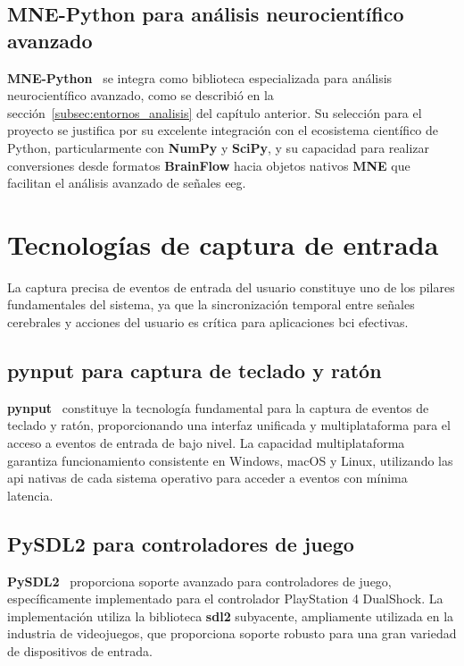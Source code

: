 \subsection{\textbf{MNE-Python} para análisis neurocientífico avanzado}
\label{subsec:mne_python}

\textbf{MNE-Python}~\cite{gramfort2013meg} se integra como biblioteca especializada para análisis neurocientífico avanzado, como se describió en la sección~\ref{subsec:entornos_analisis} del capítulo anterior. Su selección para el proyecto se justifica por su excelente integración con el ecosistema científico de Python, particularmente con \textbf{NumPy} y \textbf{SciPy}, y su capacidad para realizar conversiones desde formatos \textbf{BrainFlow} hacia objetos nativos \textbf{MNE} que facilitan el análisis avanzado de señales \acrshort{eeg}.

\section{Tecnologías de captura de entrada}
\label{sec:tecnologias_captura}

La captura precisa de eventos de entrada del usuario constituye uno de los pilares fundamentales del sistema, ya que la sincronización temporal entre señales cerebrales y acciones del usuario es crítica para aplicaciones \acrshort{bci} efectivas.

\subsection{\textbf{pynput} para captura de teclado y ratón}
\label{subsec:pynput_captura}

\textbf{pynput}~\cite{pynput_docs} constituye la tecnología fundamental para la captura de eventos de teclado y ratón, proporcionando una interfaz unificada y multiplataforma para el acceso a eventos de entrada de bajo nivel. La capacidad multiplataforma garantiza funcionamiento consistente en Windows, macOS y Linux, utilizando las \acrshort{api} nativas de cada sistema operativo para acceder a eventos con mínima latencia.

\subsection{\textbf{PySDL2} para controladores de juego}
\label{subsec:pysdl2_controladores}

\textbf{PySDL2}~\cite{pysdl2_docs} proporciona soporte avanzado para controladores de juego, específicamente implementado para el controlador PlayStation 4 DualShock. La implementación utiliza la biblioteca \textbf{\acrshort{sdl}2} subyacente, ampliamente utilizada en la industria de videojuegos, que proporciona soporte robusto para una gran variedad de dispositivos de entrada.

